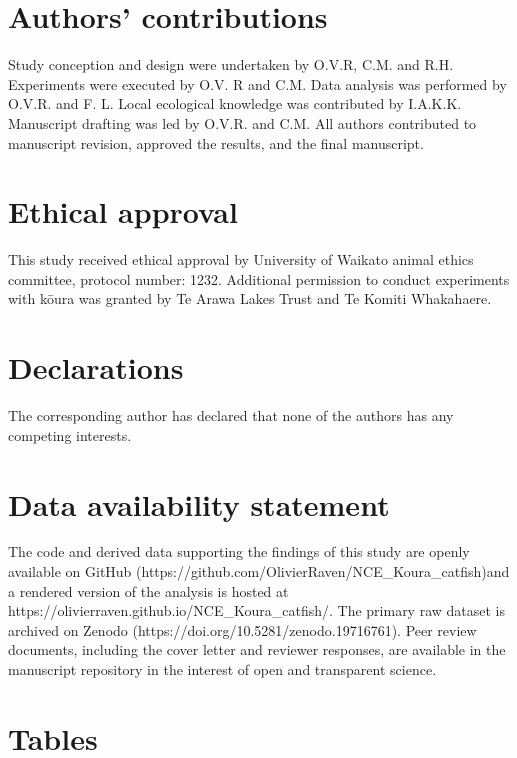 \documentclass[
  letterpaper,
  DIV=11,
  numbers=noendperiod]{scrartcl}
\newcounter{none} %
\begin{document}
\section*{Authors' contributions}\label{authors-contributions}

Study conception and design were undertaken by O.V.R, C.M. and R.H.
Experiments were executed by O.V. R and C.M. Data analysis was performed
by O.V.R. and F. L. Local ecological knowledge was contributed by
I.A.K.K. Manuscript drafting was led by O.V.R. and C.M. All authors
contributed to manuscript revision, approved the results, and the final
manuscript.

\section*{Ethical approval}\label{ethical-approval}

This study received ethical approval by University of Waikato animal
ethics committee, protocol number: 1232. Additional permission to
conduct experiments with kōura was granted by Te Arawa Lakes Trust and
Te Komiti Whakahaere.

\section*{Declarations}\label{declarations}

The corresponding author has declared that none of the authors has any
competing interests.

\section*{Data availability
statement}\label{data-availability-statement}

The code and derived data supporting the findings of this study are
openly available on GitHub
(https://github.com/OlivierRaven/NCE\_Koura\_catfish)and a rendered
version of the analysis is hosted at
https://olivierraven.github.io/NCE\_Koura\_catfish/. The primary raw
dataset is archived on Zenodo (https://doi.org/10.5281/zenodo.19716761).
Peer review documents, including the cover letter and reviewer
responses, are available in the manuscript repository in the interest of
open and transparent science.

\section*{Tables}\label{tables}
\end{document}
